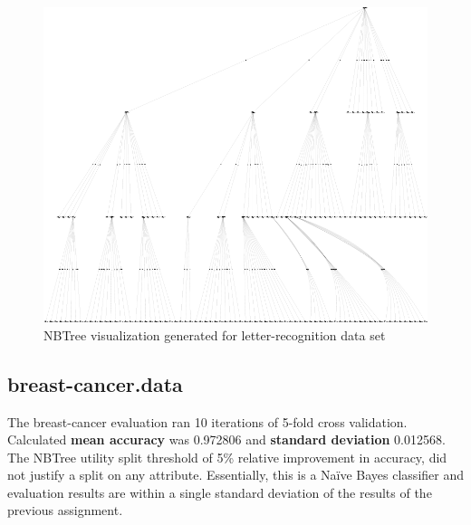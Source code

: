 \documentclass[10pt]{report}
\begin{document}
\begin{figure}
  \begin{center}
	\includegraphics[angle=90,width=!,height=\textheight]{letter-recognition}
  \end{center}
  \caption{NBTree visualization generated for letter-recognition data set}
  \label{fig:letter-recognition}
\end{figure} 


\subsection*{breast-cancer.data}
The breast-cancer evaluation ran 10 iterations of 5-fold cross
validation. Calculated \textbf{mean accuracy} was 0.972806 and
\textbf{standard deviation} 0.012568. The NBTree utility split
threshold of 5\% relative improvement in accuracy, did not justify a
split on any attribute. Essentially, this is a Na\"{i}ve Bayes
classifier and evaluation results are within a single standard
deviation of the results of the previous assignment.






\end{document}
